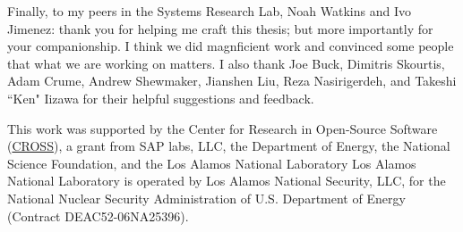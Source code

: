 \begin{frontmatter}
\begin{acknowledgements}
Finally, to my peers in the Systems Research Lab, Noah Watkins and Ivo Jimenez:
thank you for helping me craft this thesis; but more importantly for your
companionship. I think we did magnficient work and convinced some people that
what we are working on matters.  I also thank Joe Buck, Dimitris Skourtis, Adam
Crume, Andrew Shewmaker, Jianshen Liu, Reza Nasirigerdeh, and Takeshi ``Ken"
Iizawa for their helpful suggestions and feedback.

This work was supported by the Center for Research in Open-Source Software
(\href{www.cross.soe.ucsc.edu}{CROSS}), a grant from SAP labs, LLC, the Department of Energy, the National
Science Foundation, and the Los Alamos National Laboratory Los Alamos National
Laboratory is operated by Los Alamos National Security, LLC, for the National
Nuclear Security Administration of U.S. Department of Energy (Contract
DEAC52-06NA25396).

	\end{acknowledgements}
\end{frontmatter}
